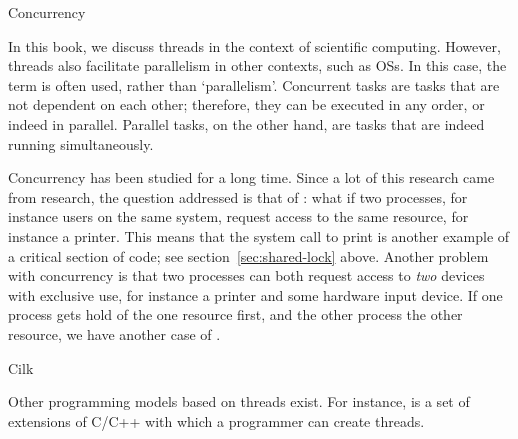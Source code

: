 {Concurrency}

In this book, we discuss threads in the context of scientific
computing. However, threads also facilitate parallelism in other contexts,
such as \acfp{OS}. In this case, the term
 is often used, rather than `parallelism'.
Concurrent tasks are tasks that are not dependent on each other; 
therefore, they can be executed in any order, or indeed in parallel.
Parallel tasks, on the other hand, are tasks that are indeed running 
simultaneously.

Concurrency has been studied for a long time. Since a lot of
this research came from  research,
the question
addressed is that of : what if two
processes, for instance users on the same system, request access to
the same resource, for instance a printer. This means that the system
call to print is another example of a critical section of code; see
section~\ref{sec:shared-lock} above. Another problem with concurrency
is that two processes can both request access to \emph{two} devices
with exclusive use, for instance a printer and some hardware input
device. If one process gets hold of the one resource first, and the
other process the other resource, we have another case of
.

 {Cilk}

Other programming models based on threads exist. For instance,
 is a set of extensions of C/C++ with which a
programmer can create threads.

